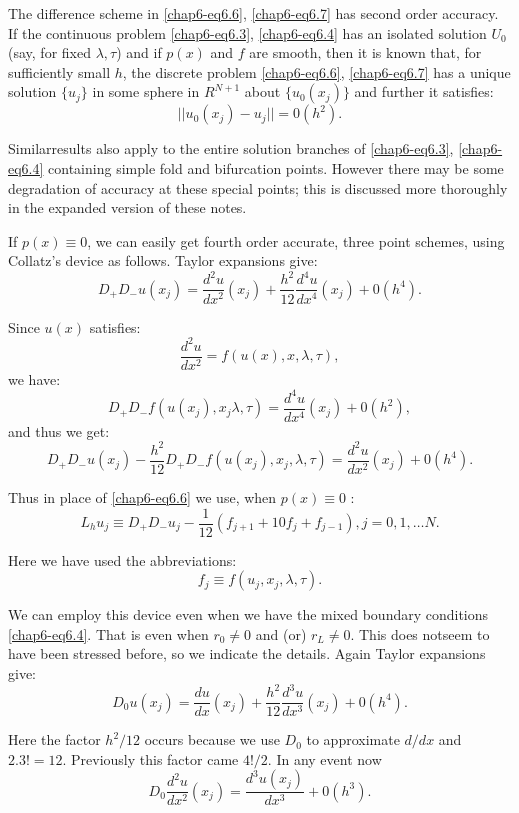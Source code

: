 The difference scheme in \eqref{chap6-eq6.6}, \eqref{chap6-eq6.7} has
second order accuracy. If 
the continuous problem \eqref{chap6-eq6.3}, \eqref{chap6-eq6.4} has an
isolated solution $U_0$ 
(say, for fixed $\lambda,\tau$) and if $p(x)$ and $f$ are smooth,
then it is known that, for sufficiently small $h$, the discrete
problem \eqref{chap6-eq6.6}, \eqref{chap6-eq6.7} has a unique solution
$\{ u_j\}$ in some sphere 
in $R^{N+1}$ about $\{u_0(x_j)\}$ and further it satisfies: 
$$
|| u_0 (x_j)-u_j || = 0(h^2).
$$

Similar\pageoriginale results also apply to the entire solution branches of
\eqref{chap6-eq6.3}, \eqref{chap6-eq6.4} containing simple fold and
bifurcation points. However 
there may be some degradation of accuracy at these special points;
this is discussed more thoroughly in the expanded version of these
notes. 

If $p(x) \equiv 0$, we can easily get fourth order accurate, three point
schemes, using Collatz's device as follows. Taylor expansions give: 
$$
D_+D_-u(x_j) = \frac{d^2 u}{dx^2}(x_j) + \frac{h^2}{12}  
\frac{d^4u}{dx^4}(x_j) + 0(h^4). 
$$

Since $u(x)$ satisfies:
$$
\frac{d^2 u}{dx^2} = f(u(x),x,\lambda,\tau), 
$$
we have:
$$
D_+D_-f(u(x_j),x_j\lambda,\tau) = \frac{d^4 u}{dx^4}(x_j) + 0(h^2), 
$$
and thus we get:
$$
D_+D_- u(x_j) - \frac{h^2}{12} D_+ D_- f(u(x_j),x_j,\lambda,\tau) =
\frac{d^2 u}{dx^2}(x_j) + 0(h^4). 
$$

Thus in place of \eqref{chap6-eq6.6} we use, when $p(x) \equiv 0$ : 
\begin{equation*}
L_h u_j \equiv D_+ D_- u_j - \frac{1}{12}(f_{j+1} + 10f_j + f_{j-1}), j=
0,1,\ldots N.\tag{6.8} \label{chap6-eq6.8}
\end{equation*}

Here we have used the abbreviations:
$$
f_j \equiv f(u_j,x_j,\lambda,\tau). 
$$

We can employ this device even when we have the mixed boundary
conditions \eqref{chap6-eq6.4}. That is even when $r_0 \neq 0$ and
(or) $r_L \neq 0$. This does not\pageoriginale seem to have been
stressed before, so we indicate 
the details. Again Taylor expansions give: 
$$
D_0u(x_j) = \frac{du}{dx} (x_j)  + \frac{h^2}{12} \frac{d^3 u}{dx^3}
(x_j) + 0(h^4). 
$$

Here the factor $h^2/12$ occurs because we use $D_0$ to approximate
$d/dx$ and  $2.3! = 12$. Previously this factor came $4!/2$. In any
event now 
$$
D_0 \frac{d^2 u}{dx^2}(x_j) = \frac{d^3 u(x_j)}{dx^3} + 0(h^3). 
$$

